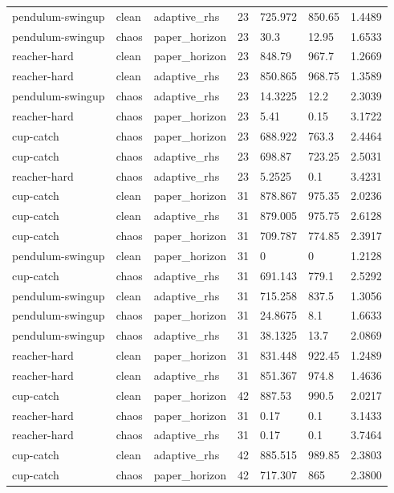 \begin{tabular}{lllllll}
pendulum-swingup & clean & adaptive\_rhs & 23 & 725.972 & 850.65 & 1.4489 \\
pendulum-swingup & chaos & paper\_horizon & 23 & 30.3 & 12.95 & 1.6533 \\
reacher-hard & clean & paper\_horizon & 23 & 848.79 & 967.7 & 1.2669 \\
reacher-hard & clean & adaptive\_rhs & 23 & 850.865 & 968.75 & 1.3589 \\
pendulum-swingup & chaos & adaptive\_rhs & 23 & 14.3225 & 12.2 & 2.3039 \\
reacher-hard & chaos & paper\_horizon & 23 & 5.41 & 0.15 & 3.1722 \\
cup-catch & chaos & paper\_horizon & 23 & 688.922 & 763.3 & 2.4464 \\
cup-catch & chaos & adaptive\_rhs & 23 & 698.87 & 723.25 & 2.5031 \\
reacher-hard & chaos & adaptive\_rhs & 23 & 5.2525 & 0.1 & 3.4231 \\
cup-catch & clean & paper\_horizon & 31 & 878.867 & 975.35 & 2.0236 \\
cup-catch & clean & adaptive\_rhs & 31 & 879.005 & 975.75 & 2.6128 \\
cup-catch & chaos & paper\_horizon & 31 & 709.787 & 774.85 & 2.3917 \\
pendulum-swingup & clean & paper\_horizon & 31 & 0 & 0 & 1.2128 \\
cup-catch & chaos & adaptive\_rhs & 31 & 691.143 & 779.1 & 2.5292 \\
pendulum-swingup & clean & adaptive\_rhs & 31 & 715.258 & 837.5 & 1.3056 \\
pendulum-swingup & chaos & paper\_horizon & 31 & 24.8675 & 8.1 & 1.6633 \\
pendulum-swingup & chaos & adaptive\_rhs & 31 & 38.1325 & 13.7 & 2.0869 \\
reacher-hard & clean & paper\_horizon & 31 & 831.448 & 922.45 & 1.2489 \\
reacher-hard & clean & adaptive\_rhs & 31 & 851.367 & 974.8 & 1.4636 \\
cup-catch & clean & paper\_horizon & 42 & 887.53 & 990.5 & 2.0217 \\
reacher-hard & chaos & paper\_horizon & 31 & 0.17 & 0.1 & 3.1433 \\
reacher-hard & chaos & adaptive\_rhs & 31 & 0.17 & 0.1 & 3.7464 \\
cup-catch & clean & adaptive\_rhs & 42 & 885.515 & 989.85 & 2.3803 \\
cup-catch & chaos & paper\_horizon & 42 & 717.307 & 865 & 2.3800 \\

\end{tabular}
